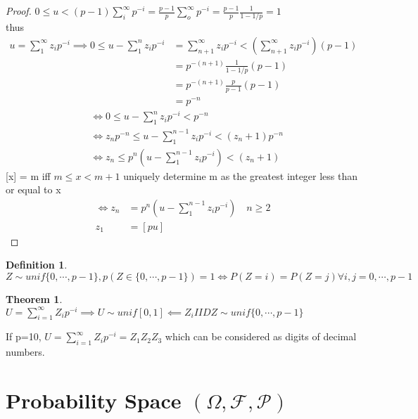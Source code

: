 \documentclass{article}
\theoremstyle{definition}
\newtheorem{definition}{Definition}[section]
\theoremstyle{thrm}
\newtheorem{thrm}{Theorem}[section]
\theoremstyle{lma}
\theoremstyle{ppst}
\theoremstyle{crlr}
\begin{document}
\begin{proof}
	$0\leq u<(p-1)\sum_i^\infty p^{-i} = \frac{p-1}{p}\sum_o^\infty p^{-i} = \frac{p-1}{p} \frac{1}{1-1/p} = 1$\\
	thus 
	\begin{align*}
		u=\sum_1^\infty z_ip^{-i} \implies 0 \leq u-\sum_1^nz_ip^{-i} &= \sum_{n+1}^\infty z_ip^{-i} < (\sum_{n+1}^\infty z_ip^{-i})(p-1)\\
		&=p^{-(n+1)}\frac{1}{1-1/p}(p-1)\\
		&=p^{-(n+1)}\frac{p}{p-1}(p-1)\\
		&=p^{-n}
	\end{align*}
	\begin{align*}
		&\iff 0 \leq u-\sum_1^nz_ip^{-i} <p^{-n}\\
		&\iff z_n p^{-n} \leq u-\sum_1^{n-1}z_ip^{-i} < (z_n+1)p^{-n}\\
		&\iff z_n \leq p^n(u-\sum_1^{n-1}z_ip^{-i} )< (z_n+1)
	\end{align*}
	[x] = m iff $m \leq x <m+1$ uniquely determine m as the greatest integer less than or equal to x
	\begin{align*}
		\iff z_n  &= p^n(u-\sum_1^{n-1}z_ip^{-i})\quad n\geq 2 \\
		z_1&=[pu]
	\end{align*}
\end{proof}
\begin{definition}
	$Z\sim unif\{0,\cdots, p-1\}, p(Z\in\{0,\cdots, p-1\})=1 \iff P(Z=i) = P(Z=j)\forall i,j = 0,\cdots, p-1$
\end{definition}
\begin{thrm}
	$U=\sum_{i=1}^\infty Z_ip^{-i} \implies U\sim unif[0,1] \impliedby Z_i IID Z\sim unif\{0,\cdots,p-1\}$
\end{thrm}
If p=10, $U=\sum_{i=1}^\infty Z_ip^{-i} = Z_1Z_2Z_3$ which can be considered as digits of decimal numbers. 

\section{Probability Space $(\Omega, \mathcal{F},\mathcal{P})$}
\end{document}
